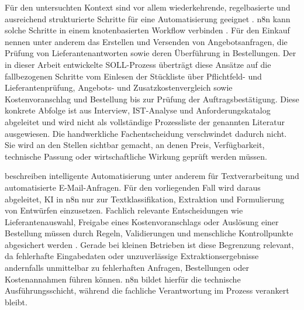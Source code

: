 \documentclass[a4paper,12pt]{article}
\begin{document}
Für den untersuchten Kontext sind vor allem wiederkehrende, regelbasierte und ausreichend strukturierte Schritte für eine Automatisierung geeignet \parencite{moreira_business_2024}. n8n kann solche Schritte in einem knotenbasierten Workflow verbinden \parencite{n8n_docs_2026}. Für den Einkauf nennen \textcite{flechsig_robotic_2022} unter anderem das Erstellen und Versenden von Angebotsanfragen, die Prüfung von Lieferantenantworten sowie deren Überführung in Bestellungen. Der in dieser Arbeit entwickelte SOLL-Prozess überträgt diese Ansätze auf die fallbezogenen Schritte vom Einlesen der Stückliste über Pflichtfeld- und Lieferantenprüfung, Angebots- und Zusatzkostenvergleich sowie Kostenvoranschlag und Bestellung bis zur Prüfung der Auftragsbestätigung. Diese konkrete Abfolge ist aus Interview, IST-Analyse und Anforderungskatalog abgeleitet und wird nicht als vollständige Prozessliste der genannten Literatur ausgewiesen. Die handwerkliche Fachentscheidung verschwindet dadurch nicht. Sie wird an den Stellen sichtbar gemacht, an denen Preis, Verfügbarkeit, technische Passung oder wirtschaftliche Wirkung geprüft werden müssen.

\textcite{ng_systematic_2021} beschreiben intelligente Automatisierung unter anderem für Textverarbeitung und automatisierte E-Mail-Anfragen. Für den vorliegenden Fall wird daraus abgeleitet, KI in n8n nur zur Textklassifikation, Extraktion und Formulierung von Entwürfen einzusetzen. Fachlich relevante Entscheidungen wie Lieferantenauswahl, Freigabe eines Kostenvoranschlags oder Auslösung einer Bestellung müssen durch Regeln, Validierungen und menschliche Kontrollpunkte abgesichert werden \parencite{ng_systematic_2021}. Gerade bei kleinen Betrieben ist diese Begrenzung relevant, da fehlerhafte Eingabedaten oder unzuverlässige Extraktionsergebnisse andernfalls unmittelbar zu fehlerhaften Anfragen, Bestellungen oder Kostenannahmen führen können. n8n bildet hierfür die technische Ausführungsschicht, während die fachliche Verantwortung im Prozess verankert bleibt.
\end{document}
